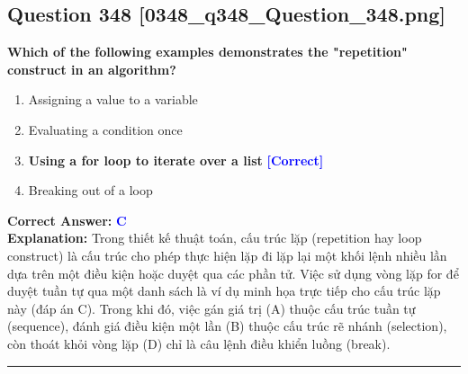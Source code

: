 \documentclass[11pt,a4paper]{article}
\begin{document}
\begin{minipage}{\textwidth}
\subsection*{Question 348 \quad \footnotesize{[0348\_q348\_Question\_348.png]}}
\noindent \textbf{Which of the following examples demonstrates the "repetition" construct in an algorithm?}

\begin{enumerate}[label=\Alph*.]
    \item Assigning a value to a variable
    \item Evaluating a condition once
    \item \textbf{Using a for loop to iterate over a list} \hfill \textcolor{blue}{\textbf{[Correct]}}
    \item Breaking out of a loop
\end{enumerate}

\noindent \textbf{Correct Answer:} \textcolor{blue}{\textbf{C}} \\[2pt]
\noindent \textbf{Explanation:} Trong thiết kế thuật toán, cấu trúc lặp (repetition hay loop construct) là cấu trúc cho phép thực hiện lặp đi lặp lại một khối lệnh nhiều lần dựa trên một điều kiện hoặc duyệt qua các phần tử. Việc sử dụng vòng lặp for để duyệt tuần tự qua một danh sách là ví dụ minh họa trực tiếp cho cấu trúc lặp này (đáp án C). Trong khi đó, việc gán giá trị (A) thuộc cấu trúc tuần tự (sequence), đánh giá điều kiện một lần (B) thuộc cấu trúc rẽ nhánh (selection), còn thoát khỏi vòng lặp (D) chỉ là câu lệnh điều khiển luồng (break).

\par\vspace{0.3cm}
\hrule
\vspace{0.3cm}
\end{minipage}
\end{document}
